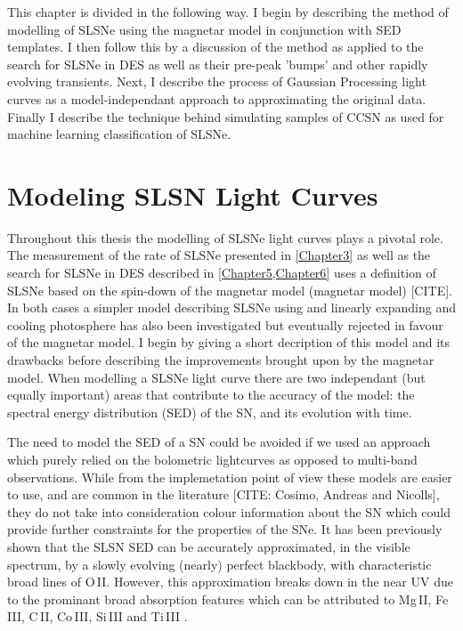 This chapter is divided in the following way. I begin by describing the method of modelling of SLSNe using the magnetar model in conjunction with SED templates. I then follow this by a discussion of the method as applied to the search for SLSNe in DES as well as their pre-peak 'bumps' and other rapidly evolving transients. Next, I describe the process of Gaussian Processing light curves as a model-independant approach to approximating the original data. Finally I describe the technique behind simulating samples of CCSN as used for machine learning classification of SLSNe.

\section{Modeling SLSN Light Curves} \label{sec:SLAP}
Throughout this thesis the modelling of SLSNe light curves plays a pivotal role. The measurement of the rate of SLSNe presented in \cref{Chapter3} as well as the search for SLSNe in DES described in \cref{Chapter5,Chapter6} uses a definition of SLSNe based on the spin-down of the magnetar model (magnetar model) [CITE]. In both cases a simpler model describing SLSNe using and linearly expanding and cooling photosphere has also been investigated but eventually rejected in favour of the magnetar model. I begin by giving a short decription of this model and its drawbacks before describing the improvements brought upon by the magnetar model. When modelling a SLSNe light curve there are two independant (but equally important) areas that contribute to the accuracy of the model: the spectral energy distribution (SED) of the SN, and its evolution with time.

The need to model the SED of a SN could be avoided if we used an approach which purely relied on the bolometric lightcurves as opposed to multi-band observations. While from the implemetation point of view these models are easier to use, and are common in the literature [CITE: Cosimo, Andreas and Nicolls], they do not take into consideration colour information about the SN which could provide further constraints for the properties of the SNe. It has been previously shown \citep{2011ApJ...743..114C,2013ApJ...779...98H,2015MNRAS.449.1215P,2014ApJ...797...24V} that the SLSN SED can be accurately approximated, in the visible spectrum, by a slowly evolving (nearly) perfect blackbody, with characteristic broad lines of O\,II. However, this approximation breaks down in the near UV due to the prominant broad absorption features which can be attributed to Mg\,II, Fe\,III, C\,II, Co\,III, Si\,III and Ti\,III \citep[see][for line identifications]{2016MNRAS.458.3455M}.

